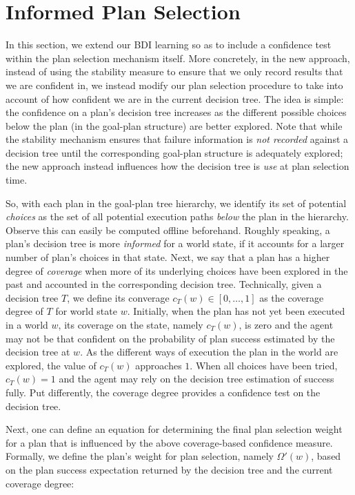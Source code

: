 \section{Informed Plan Selection}\label{sec:coverage}

In this section, we extend our BDI learning so as to include a confidence test
within the plan selection mechanism itself. More concretely, in the new approach,
instead of using the stability measure to ensure that we only record results that
we are confident in, we instead modify our plan selection procedure to take into
account of how confident we are in the current decision tree.
The idea is simple: the confidence on a plan's decision tree increases as the
different possible choices below the plan (in the goal-plan structure) are better
explored.
Note that while the stability mechanism ensures that failure information is
\emph{not recorded} against a decision tree until the corresponding goal-plan
structure is adequately explored; the new approach instead influences how the
decision tree is \emph{use} at plan selection time.


So, with each plan in the goal-plan tree hierarchy, we identify its set of
potential \textit{choices} as the set of all potential execution paths
\textit{below} the plan in the hierarchy. Observe this can easily be computed
offline beforehand.
Roughly speaking, a plan's decision tree is more \textit{informed} for a world
state, if it accounts for a larger number of plan's choices in that state.
Next, we say that a plan has a higher degree of \emph{coverage} when more of its
underlying choices have been explored in the past and accounted in the
corresponding decision tree.
Technically, given a decision tree $T$, we define its converage $c_T(w) \in
[0,\ldots,1]$ as the coverage degree of $T$ for world state $w$.
Initially, when the plan has not yet been executed in a world $w$, its coverage
on the state, namely $c_T(w)$, is zero and the agent may not be that confident on
the probability of plan success estimated by the decision tree at $w$. As the
different ways of execution the plan in the world are explored, the value of
$c_T(w)$ approaches $1$. When all choices have been tried, $c_T(w)=1$ and the
agent may rely on the decision tree estimation of success fully.
Put differently, the coverage degree provides a confidence test on the decision
tree.


Next, one can define an equation for determining the final plan selection weight
for a plan that is influenced by the above coverage-based confidence measure.
Formally, we define the plan's weight for plan selection, namely $\Omega'(w)$, based
on the plan success expectation returned by the decision tree and the current
coverage degree:

